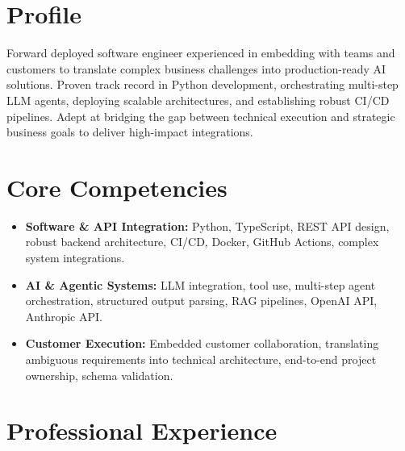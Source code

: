 \documentclass[11pt,a4paper,sans]{moderncv}
\begin{document}
\makecvtitle

\vspace{-2em}
\section{Profile}
Forward deployed software engineer experienced in embedding with teams and customers to translate complex business challenges into production-ready AI solutions. Proven track record in Python development, orchestrating multi-step LLM agents, deploying scalable architectures, and establishing robust CI/CD pipelines. Adept at bridging the gap between technical execution and strategic business goals to deliver high-impact integrations.

\section{Core Competencies}
\begin{itemize}
\item \textbf{Software \& API Integration:} Python, TypeScript, REST API design, robust backend architecture, CI/CD, Docker, GitHub Actions, complex system integrations.
\item \textbf{AI \& Agentic Systems:} LLM integration, tool use, multi-step agent orchestration, structured output parsing, RAG pipelines, OpenAI API, Anthropic API.
\item \textbf{Customer Execution:} Embedded customer collaboration, translating ambiguous requirements into technical architecture, end-to-end project ownership, schema validation.
\end{itemize}

\section{Professional Experience}
\vspace{1pt}
\vspace{3pt}
\end{document}
